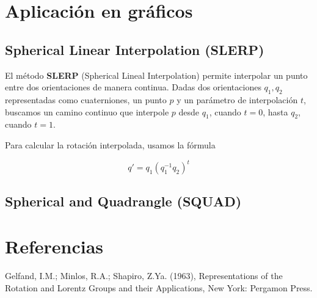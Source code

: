 \documentclass{article}
\theoremstyle{plain}
\theoremstyle{definition}
\theoremstyle{remark}
\begin{document}


\section{Aplicación en gráficos}

\subsection{Spherical Linear Interpolation (SLERP)}

El método \textbf{SLERP} (Spherical Lineal Interpolation) permite interpolar
un punto entre dos orientaciones de manera continua. Dadas dos orientaciones
$q_1,q_2$ representadas como cuaterniones, un punto $p$ y un parámetro de
interpolación $t$, buscamos un camino continuo que interpole $p$ desde $q_1$,
cuando $t=0$, hasta $q_2$, cuando $t=1$.

Para calcular la rotación interpolada, usamos la fórmula

\[q' = q_1(q_1^{-1}q_2)^t\]

\subsection{Spherical and Quadrangle (SQUAD)}



\section{Referencias}


\begin{thebibliography}{9}

  Gelfand, I.M.; Minlos, R.A.; Shapiro, Z.Ya. (1963),
  Representations of the Rotation and Lorentz Groups and their Applications,
  New York: Pergamon Press.

\end{thebibliography}
\end{document}
